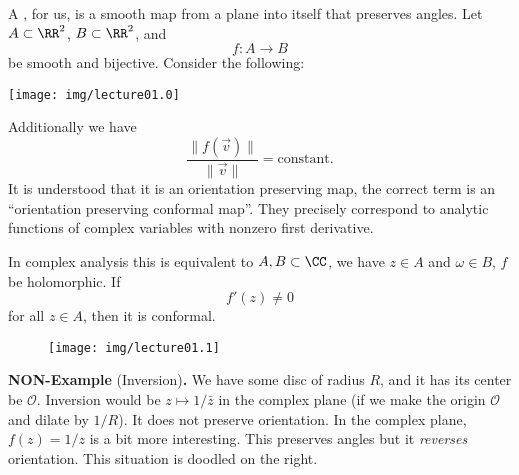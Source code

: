 A , for us, is  a smooth map from a plane into
itself that preserves angles. Let $A\subset\RR^{2}$,
$B\subset\RR^{2}$, and
\begin{equation}
f\colon A\to B
\end{equation}
be smooth and bijective. Consider the following:
\begin{center}
\texttt{[image: img/lecture01.0]}
\end{center}
Additionally we have
\begin{equation}
\frac{\|f(\vec{v})\|}{\|\vec{v}\|}=\mbox{constant}.
\end{equation}
It is understood that it is an orientation preserving map, the
correct term is an ``orientation preserving conformal map''. They
precisely correspond to analytic functions of complex variables
with nonzero first derivative.

In complex analysis this is equivalent to $A,B\subset\CC$, we
have $z\in A$ and $\omega\in B$, $f$ be holomorphic. If
\begin{equation}
f'(z)\not=0
\end{equation}
for all $z\in A$, then it is conformal.

\medskip
\begin{wrapfigure}{r}{1.5in}
\vspace{-40pt}
\begin{center}
\texttt{[image: img/lecture01.1]}
\end{center}
\vspace{-20pt}
\end{wrapfigure}
\noindent\textbf{NON-Example }(Inversion)\textbf{.\enspace}
We have some disc of radius $R$, and it has its center be
$\mathcal{O}$. Inversion would be
$z\mapsto1/\bar{z}$ in the complex plane (if we make the origin
$\mathcal{O}$ and dilate by $1/R$).
It does not preserve orientation. In the complex plane,
$f(z)=1/z$ is a bit more interesting. This preserves angles but
it \emph{reverses} orientation. This situation is doodled on the
right. 
\medbreak

